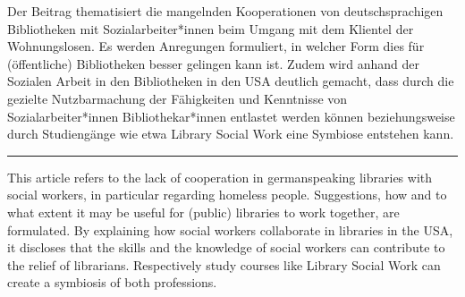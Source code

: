 Der Beitrag thematisiert die mangelnden Kooperationen von
deutschsprachigen Bibliotheken mit Sozialarbeiter*innen beim Umgang mit
dem Klientel der Wohnungslosen. Es werden Anregungen formuliert, in
welcher Form dies für (öffentliche) Bibliotheken besser gelingen kann
ist. Zudem wird anhand der Sozialen Arbeit in den Bibliotheken in den
USA deutlich gemacht, dass durch die gezielte Nutzbarmachung der
Fähigkeiten und Kenntnisse von Sozialarbeiter*innen Bibliothekar*innen
entlastet werden können beziehungsweise durch Studiengänge wie etwa
Library Social Work eine Symbiose entstehen kann.

\begin{center}\rule{0.5\linewidth}{0.5pt}\end{center}

\noindent This article refers to the lack of cooperation in germanspeaking
libraries with social workers, in particular regarding homeless people.
Suggestions, how and to what extent it may be useful for (public)
libraries to work together, are formulated. By explaining how social
workers collaborate in libraries in the USA, it discloses that the
skills and the knowledge of social workers can contribute to the relief
of librarians. Respectively study courses like Library Social Work can
create a symbiosis of both professions.
